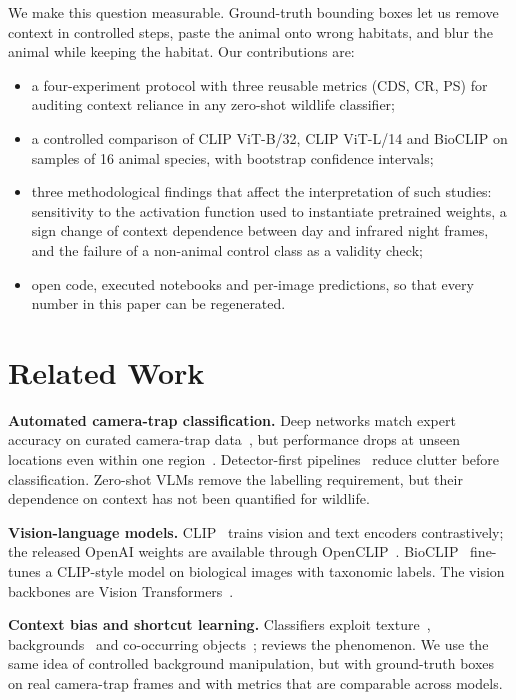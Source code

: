 \documentclass[conference]{IEEEtran}
\begin{document}
We make this question measurable. Ground-truth bounding boxes let us remove context in controlled steps, paste the animal onto wrong habitats, and blur the animal while keeping the habitat. Our contributions are:
\begin{itemize}
\item a four-experiment protocol with three reusable metrics (CDS, CR, PS) for auditing context reliance in any zero-shot wildlife classifier;
\item a controlled comparison of CLIP ViT-B/32, CLIP ViT-L/14 and BioCLIP on \NSamples{} samples of 16 animal species, with bootstrap confidence intervals;
\item three methodological findings that affect the interpretation of such studies: sensitivity to the activation function used to instantiate pretrained weights, a sign change of context dependence between day and infrared night frames, and the failure of a non-animal control class as a validity check;
\item open code, executed notebooks and per-image predictions, so that every number in this paper can be regenerated.
\end{itemize}

\section{Related Work}
\textbf{Automated camera-trap classification.} Deep networks match expert accuracy on curated camera-trap data~\cite{norouzzadeh2018,willi2019,tabak2019}, but performance drops at unseen locations even within one region~\cite{beery2018,schneider2020}. Detector-first pipelines~\cite{beery2019} reduce clutter before classification. Zero-shot VLMs remove the labelling requirement, but their dependence on context has not been quantified for wildlife.

\textbf{Vision-language models.} CLIP~\cite{radford2021} trains vision and text encoders contrastively; the released OpenAI weights are available through OpenCLIP~\cite{ilharco2021}. BioCLIP~\cite{stevens2024} fine-tunes a CLIP-style model on biological images with taxonomic labels. The vision backbones are Vision Transformers~\cite{dosovitskiy2021}.

\textbf{Context bias and shortcut learning.} Classifiers exploit texture~\cite{geirhos2019}, backgrounds~\cite{xiao2021} and co-occurring objects~\cite{singh2020}; \cite{geirhos2020} reviews the phenomenon. We use the same idea of controlled background manipulation, but with ground-truth boxes on real camera-trap frames and with metrics that are comparable across models.
\end{document}
